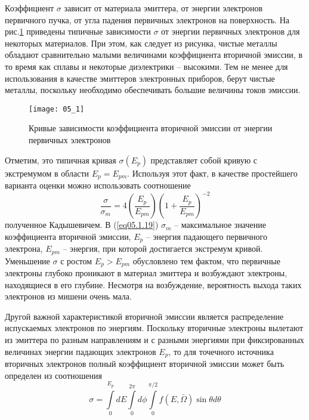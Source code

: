 Коэффициент \( \sigma \) зависит от материала эмиттера, от энергии электронов 
первичного пучка, от угла падения первичных электронов на поверхность. На 
рис.\ref{img05.1} приведены типичные зависимости \( \sigma \) от энергии 
первичных электронов для некоторых материалов. При этом, как следует из 
рисунка, чистые металлы обладают сравнительно малыми величинами коэффициента 
вторичной эмиссии, в то время как сплавы и некоторые диэлектрики -- высокими. 
Тем не менее для использования в качестве эмиттеров электронных приборов, 
берут чистые металлы, поскольку необходимо обеспечивать большие величины токов 
эмиссии.
\begin{figure}[h]
    \center
    \texttt{[image: 05\_1]}
    \caption{Кривые зависимости коэффициента вторичной эмиссии от энергии 
        первичных электронов}
    \label{img05.1}
\end{figure}

Отметим, это типичная кривая \( \sigma(E_p) \) представляет собой кривую с 
экстремумом в области \( E_p = E_{pm} \). Используя этот факт, в качестве 
простейшего варианта оценки можно использовать соотношение
\begin{equation}
    \frac{\sigma}{\sigma_m} = 4\left( \frac{E_p}{E_{pm}} \right)
        \left( 1 + \frac{E_p}{E_{pm}} \right)^{-2}
    \label{eq05.1.19}
\end{equation}
полученное Кадышевичем. В (\ref{eq05.1.19}) \( \sigma_{m} \) -- максимальное 
значение коэффициента вторичной эмиссии, \( E_p \) -- энергия падающего 
первичного электрона, \( E_{pm} \) -- энергия, при которой достигается 
экстремум кривой. Уменьшение \( \sigma \) с ростом \( E_p > E_{pm} \) 
обусловлено тем фактом, что первичные электроны глубоко проникают в материал 
эмиттера и возбуждают электроны, находящиеся в его глубине. Несмотря на 
возбуждение, вероятность выхода таких электронов из мишени очень мала.

Другой важной характеристикой вторичной эмиссии является распределение 
испускаемых электронов по энергиям. Поскольку вторичные электроны вылетают 
из эмиттера по разным направлениям и с разными энергиями при фиксированных 
величинах энергии падающих электронов \( E_p \), то для точечного источника 
вторичных электронов полный коэффициент вторичной эмиссии может быть определен 
из соотношения
\begin{equation}
    \sigma = \int\limits_{0}^{E_p} dE \int\limits_{0}^{2\pi} d\phi 
        \int\limits_{0}^{\pi/2} f(E,\bar{\Omega})\sin\theta d\theta
    \label{eq05.1.20}
\end{equation}

